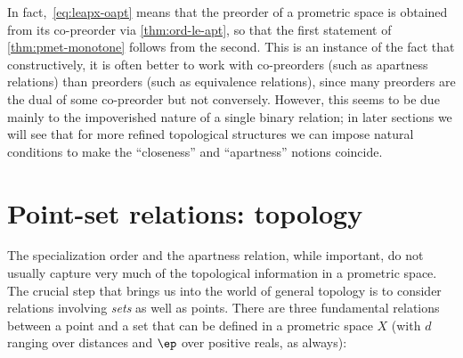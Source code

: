 \documentclass{article}
\def\oapt{\mathrel{\!\not\,\not\lesssim}}
\def\leapx{\lesssim}
\begin{document}
In fact,~\eqref{eq:leapx-oapt} means that the preorder of a prometric space is obtained from its co-preorder via \cref{thm:ord-le-apt}, so that the first statement of \cref{thm:pmet-monotone} follows from the second.
This is an instance of the fact that constructively, it is often better to work with co-preorders (such as apartness relations) than preorders (such as equivalence relations), since many preorders are the dual of some co-preorder but not conversely.
However, this seems to be due mainly to the impoverished nature of a single binary relation; in later sections we will see that for more refined topological structures we can impose natural conditions to make the ``closeness'' and ``apartness'' notions coincide.




\section{Point-set relations: topology}
\label{sec:point-set}
\label{sec:topology}

The specialization order and the apartness relation, while important, do not usually capture very much of the topological information in a prometric space.
The crucial step that brings us into the world of general topology is to consider relations involving \emph{sets} as well as points.
There are three fundamental relations between a point and a set that can be defined in a prometric space $X$ (with $d$ ranging over distances and $\ep$ over positive reals, as always):
\end{document}
